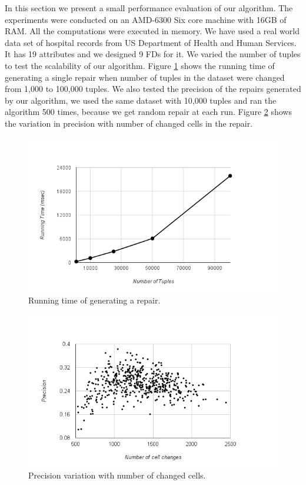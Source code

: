In this section we present a small performance evaluation of our algorithm.
The experiments were conducted on an AMD-6300 Six core machine with 16GB of RAM.
All the computations were executed in memory.
We have used a real world data set of hospital records from US Department of Health and Human Services.
It has 19 attributes and we designed 9 FDs for it.
We varied the number of tuples to test the scalability of our algorithm.
Figure \ref{fig:chart_2} shows the running time of generating a single repair when number of tuples in the dataset were changed from 1,000 to 100,000 tuples.
We also tested the precision of the repairs generated by our algorithm, we used the same dataset with 10,000 tuples and ran the algorithm 500 times, because we get random repair at each run.
Figure \ref{fig:chart_1} shows the variation in precision with number of changed cells in the repair.


\begin{figure}
   \centering
   \includegraphics[scale=0.33]{chart_2.png}
   \caption{Running time of generating a repair.}
   \label{fig:chart_2}
\end{figure}

\begin{figure}
   \centering
   \includegraphics[scale=0.33]{chart_1.png}
   \caption{Precision variation with number of changed cells.}
   \label{fig:chart_1}
\end{figure}



